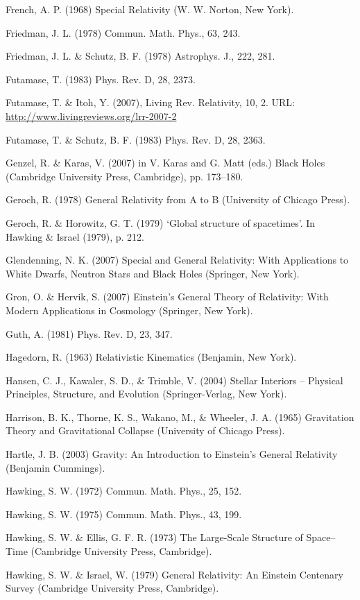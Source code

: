 {French, A. P. (1968) Special Relativity (W. W. Norton, New York).


Friedman, J. L. (1978) Commun. Math. Phys., 63, 243.


Friedman, J. L. \& Schutz, B. F. (1978) Astrophys. J., 222, 281.


Futamase, T. (1983) Phys. Rev. D, 28, 2373.


Futamase, T. \& Itoh, Y. (2007), Living Rev. Relativity, 10, 2. URL: \url{http://www.livingreviews.org/lrr-2007-2}


Futamase, T. \& Schutz, B. F. (1983) Phys. Rev. D, 28, 2363.


Genzel, R. \& Karas, V. (2007) in V. Karas and G. Matt (eds.) Black Holes (Cambridge University Press, Cambridge), pp. 173–180.


Geroch, R. (1978) General Relativity from A to B (University of Chicago Press).


Geroch, R. \& Horowitz, G. T. (1979) ‘Global structure of spacetimes’. In Hawking \& Israel (1979), p. 212.


Glendenning, N. K. (2007) Special and General Relativity: With Applications to White Dwarfs, Neutron Stars and Black Holes (Springer, New York).


Gron, O. \& Hervik, S. (2007) Einstein’s General Theory of Relativity: With Modern Applications in Cosmology (Springer, New York).


Guth, A. (1981) Phys. Rev. D, 23, 347.


Hagedorn, R. (1963) Relativistic Kinematics (Benjamin, New York).


Hansen, C. J., Kawaler, S. D., \& Trimble, V. (2004) Stellar Interiors – Physical Principles, Structure, and Evolution (Springer-Verlag, New York).


Harrison, B. K., Thorne, K. S., Wakano, M., \& Wheeler, J. A. (1965) Gravitation Theory and Gravitational Collapse (University of Chicago Press).


Hartle, J. B. (2003) Gravity: An Introduction to Einstein’s General Relativity (Benjamin Cummings).


Hawking, S. W. (1972) Commun. Math. Phys., 25, 152.


Hawking, S. W. (1975) Commun. Math. Phys., 43, 199.


Hawking, S. W. \& Ellis, G. F. R. (1973) The Large-Scale Structure of Space–Time (Cambridge University Press, Cambridge).


Hawking, S. W. \& Israel, W. (1979) General Relativity: An Einstein Centenary Survey (Cambridge University Press, Cambridge).


}
